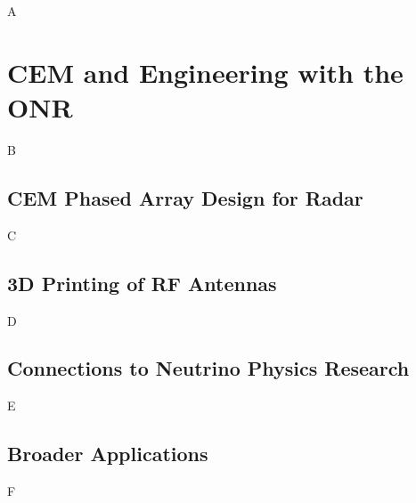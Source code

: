 \documentclass[../../../main.tex]{subfiles}
\begin{document}
A
\section{CEM and Engineering with the ONR}
B
\subsection{CEM Phased Array Design for Radar}
C
\subsection{3D Printing of RF Antennas}
D
\subsection{Connections to Neutrino Physics Research}
E
\subsection{Broader Applications}
F
\end{document}
